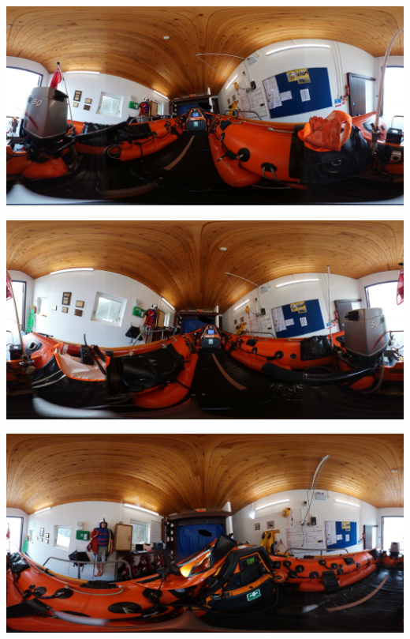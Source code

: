 \documentclass[ %
                    author={Elis Jones},
                supervisor={Dr. Kirsten Cater},
                    degree={BSc},
                     title={The Effect of Presentation Medium on Spatial Cognition},
                  subtitle={in the Virtual Environment},
                      year={2018} ]{dissertation}
\begin{document}
\begin{minipage}{\textwidth}
\begin{center}
\begin{minipage}{0.3\textwidth}
    \end{minipage}\hfill
\end{center}
\begin{center}
    \centering
    \begin{minipage}{0.3\textwidth}
        \centering
        \includegraphics[width=1\textwidth]{images/360-items/gloves.JPG}
    \end{minipage}\hfill
    \begin{minipage}{0.3\textwidth}
        \centering
        \includegraphics[width=1\textwidth]{images/360-items/handheld.JPG}
    \end{minipage}\hfill
    \begin{minipage}{0.3\textwidth}
        \centering
        \includegraphics[width=1\textwidth]{images/360-items/light.JPG}

\end{minipage}
\end{center}
\end{minipage}
\end{document}
